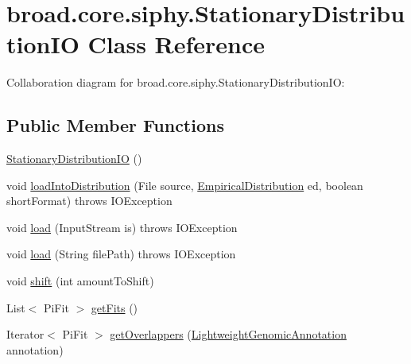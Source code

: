 \hypertarget{classbroad_1_1core_1_1siphy_1_1_stationary_distribution_i_o}{\section{broad.\+core.\+siphy.\+Stationary\+Distribution\+I\+O Class Reference}
\label{classbroad_1_1core_1_1siphy_1_1_stationary_distribution_i_o}
}


Collaboration diagram for broad.\+core.\+siphy.\+Stationary\+Distribution\+I\+O\+:
\subsection*{Public Member Functions}
\begin{DoxyCompactItemize}
\item 
\hyperlink{classbroad_1_1core_1_1siphy_1_1_stationary_distribution_i_o_adcd10705e244d6ede5a01dfcf0145bc2}{Stationary\+Distribution\+I\+O} ()
\item 
void \hyperlink{classbroad_1_1core_1_1siphy_1_1_stationary_distribution_i_o_acd276af97ba165d7ec567ce4e4e3234e}{load\+Into\+Distribution} (File source, \hyperlink{classbroad_1_1core_1_1math_1_1_empirical_distribution}{Empirical\+Distribution} ed, boolean short\+Format)  throws I\+O\+Exception 
\item 
void \hyperlink{classbroad_1_1core_1_1siphy_1_1_stationary_distribution_i_o_af01fefbf4f2f7928bf6f2a7a415585b6}{load} (Input\+Stream is)  throws I\+O\+Exception 
\item 
void \hyperlink{classbroad_1_1core_1_1siphy_1_1_stationary_distribution_i_o_a5659a6124a9641ef93e9f973fa214ba2}{load} (String file\+Path)  throws I\+O\+Exception 
\item 
void \hyperlink{classbroad_1_1core_1_1siphy_1_1_stationary_distribution_i_o_a858c5c52b0e6838bb8fba793cf3fcf62}{shift} (int amount\+To\+Shift)
\item 
List$<$ Pi\+Fit $>$ \hyperlink{classbroad_1_1core_1_1siphy_1_1_stationary_distribution_i_o_a3a8f733bc29d80c9e4705b3cb328edf8}{get\+Fits} ()
\item 
Iterator$<$ Pi\+Fit $>$ \hyperlink{classbroad_1_1core_1_1siphy_1_1_stationary_distribution_i_o_a10be4a3b31d2fdb2d49acc1a8df3891e}{get\+Overlappers} (\hyperlink{interfacebroad_1_1core_1_1annotation_1_1_lightweight_genomic_annotation}{Lightweight\+Genomic\+Annotation} annotation)
\end{DoxyCompactItemize}



